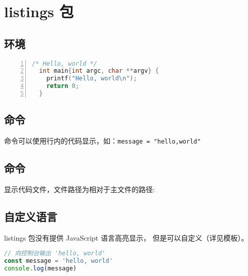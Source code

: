 \section{listings 包}

\subsection{\protect{} 环境}

\begin{lstlisting}[language=C,caption={C/C++ 语言},numbers=left]
  /* Hello, world */
  int main{int argc, char **argv} {
    printf("Hello, world\n");
    return 0;
  }
\end{lstlisting}

\subsection{\protect{} 命令}

 命令可以使用行内的代码显示，如：\texttt{\lstinline|message = "hello,world"|}

\subsection{\protect{} 命令}

显示代码文件，文件路径为相对于主文件的路径:



\subsection{自定义语言}

listings 包没有提供 JavaScript 语言高亮显示， 但是可以自定义（详见模板）。

\begin{lstlisting}[language=js,caption={JavaScript 语言}]
// 向控制台输出 'hello, world'
const message = 'hello, world'
console.log(message)
\end{lstlisting}

